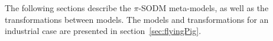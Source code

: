 The following sections describe the $\pi$-SODM meta-models, as well as the transformations between models.
The models and transformations for an industrial case are presented in section~\ref{sec:flyingPig}.

%


